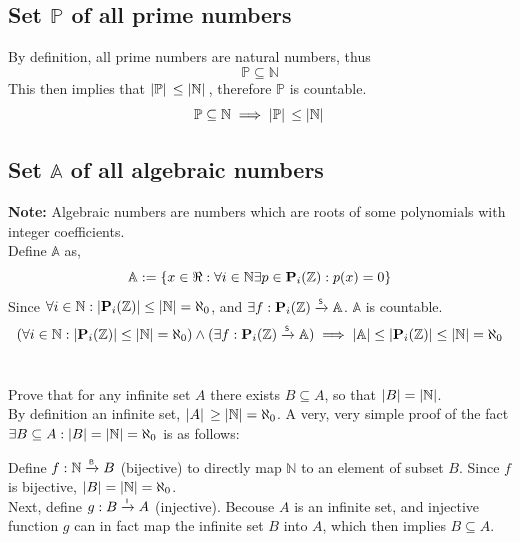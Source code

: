 \documentclass[]{article}
\newcommand{\N}{\mathbb{N}}
\newcommand{\Z}{\mathbb{Z}}
\newcommand{\toI}{\xrightarrow{\textsf{\tiny I}}}
\newcommand{\toS}{\xrightarrow{\textsf{\tiny S}}}
\newcommand{\toB}{\xrightarrow{\textsf{\tiny B}}}
\begin{document}
\subsection{Set $\mathbb{P}$ of all prime numbers}
By definition, all prime numbers are natural numbers, thus
\begin{displaymath}
	\mathbb{P} \subseteq \N
\end{displaymath}
This then implies that $\abs*{\mathbb{P}} \leq \abs*{\N}$, therefore $\mathbb{P}$ is countable.
\begin{displaymath}
	\mathbb{P} \subseteq \N \implies \abs*{\mathbb{P}} \leq \abs*{\N}
\end{displaymath}

\subsection{Set $\mathbb{A}$ of all algebraic numbers}
\textbf{Note:} Algebraic numbers are numbers which are roots of 
some polynomials with integer coefficients.\\

Define $\mathbb{A}$ as,
\begin{displaymath}
	\mathbb{A} := \qty{x \in \real : \forall i \in \N \exists p \in \mathbf{P}_i(\Z) : 
	p(x) = 0}
\end{displaymath}
Since $\forall i \in \N : \abs{\mathbf{P}_i(\Z)} \leq \abs{\N} = \aleph_0$,
and $\exists f: \mathbf{P}_i(\Z) \toS \mathbb{A}$.
$\mathbb{A}$ is countable.
\begin{displaymath}
	\qty(\forall i \in \N : \abs{\mathbf{P}_i(\Z)} \leq \abs{\N} = \aleph_0)
	\land (\exists f: \mathbf{P}_i(\Z) \toS \mathbb{A})
	\implies \abs{\mathbb{A}} \leq \abs{\mathbf{P}_i(\Z)} \leq \abs{\N} = \aleph_0
\end{displaymath}

\newpage
\section{}
Prove that for any infinite set $A$ there exists $B \subseteq A$, so that $\abs{B}=\abs{\N}$.\\

By definition an infinite set, $\abs*{A} \geq \abs{\N} = \aleph_0$.
A very, very simple proof of the fact $\exists B \subseteq A : \abs{B}=\abs{\N} = \aleph_0$ 
is as follows:

Define $f : \N \toB B$ (bijective) to directly map $\N$ to an element of subset $B$. 
Since $f$ is bijective, $\abs{B}=\abs{\N} = \aleph_0$.\\
Next, define $g : B \toI A$ (injective). Becouse $A$ is an infinite set, 
and injective function $g$ can in fact map the infinite set $B$ into $A$, 
which then implies $B \subseteq A$.
\end{document}

